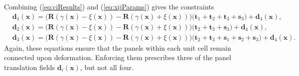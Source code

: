 \documentclass[aps,11pt,tightenlines,notitlepage,superscriptaddress,longbibliography,nofootinbib]{revtex4-1}
\begin{document}
Combining (\ref{eq:ciResults}) and (\ref{eq:xijParams}) gives the constraints 
\begin{equation}
\begin{aligned}\label{eq:ciPrescribe}
&\mathbf{d}_1(\mathbf{x}) = \Big( \mathbf{R}(\gamma(\mathbf{x}) - \xi(\mathbf{x}) )-  \mathbf{R}(\gamma(\mathbf{x}) +  \xi(\mathbf{x})) \Big) \big( \mathbf{t}_1 + \mathbf{t}_2 + \mathbf{t}_3  + \mathbf{s}_3\big) + \mathbf{d}_4(\mathbf{x}), \\
&\mathbf{d}_2(\mathbf{x}) = \Big( \mathbf{R}(\gamma(\mathbf{x}) - \xi(\mathbf{x}) )-  \mathbf{R}(\gamma(\mathbf{x}) +  \xi(\mathbf{x})) \Big) \big(  \mathbf{t}_2 + \mathbf{t}_3 + \mathbf{s}_3\big) + \mathbf{d}_4(\mathbf{x}) , \\
&\mathbf{d}_3(\mathbf{x}) = \Big( \mathbf{R}(\gamma(\mathbf{x}) - \xi(\mathbf{x}) )-  \mathbf{R}(\gamma(\mathbf{x}) +  \xi(\mathbf{x})) \Big) \big(  \mathbf{t}_2 + \mathbf{t}_3 + \mathbf{s}_1 + \mathbf{s}_2 +  \mathbf{s}_3\big)  + \mathbf{d}_4(\mathbf{x}).
\end{aligned}
\end{equation}
Again, these equations ensure that the panels within each unit cell remain connected upon deformation. Enforcing them prescribes three of the panel translation fields $\mathbf{d}_i(\mathbf{x})$, but not all four.
\end{document}
